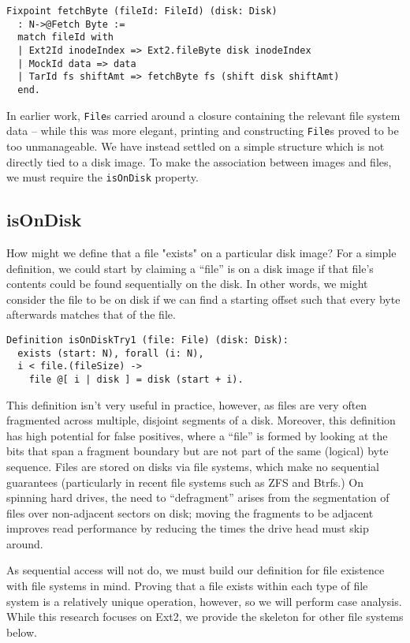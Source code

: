 \documentclass[nocopyrightspace]{sigplanconf}
\begin{document}
\begin{lstlisting}
Fixpoint fetchByte (fileId: FileId) (disk: Disk)
  : N->@Fetch Byte := 
  match fileId with
  | Ext2Id inodeIndex => Ext2.fileByte disk inodeIndex
  | MockId data => data
  | TarId fs shiftAmt => fetchByte fs (shift disk shiftAmt)
  end.
\end{lstlisting}

In earlier work, {\tt File}s carried around a closure containing the relevant
file system data -- while this was more elegant, printing and constructing
{\tt File}s proved to be too unmanageable. We have instead settled on a simple
structure which is not directly tied to a disk image. To make the association
between images and files, we must require the {\tt isOnDisk} property.

\subsection{isOnDisk}

How might we define that a file "exists" on a particular disk image? For a
simple definition, we could start by claiming a ``file'' is on a disk image if
that file's contents could be found sequentially on the disk. In other words,
we might consider the file to be on disk if we can find a starting offset such
that every byte afterwards matches that of the file.

\begin{lstlisting}
Definition isOnDiskTry1 (file: File) (disk: Disk):
  exists (start: N), forall (i: N),
  i < file.(fileSize) -> 
    file @[ i | disk ] = disk (start + i).
\end{lstlisting}

This definition isn't very useful in practice, however, as files are very
often fragmented across multiple, disjoint segments of a disk. Moreover, this
definition has high potential for false positives, where a ``file'' is formed
by looking at the bits that span a fragment boundary but are not part of the
same (logical) byte sequence. Files are stored on disks via file systems,
which make no sequential guarantees (particularly in recent file systems such
as ZFS and Btrfs.) On spinning hard drives, the need to ``defragment'' arises
from the segmentation of files over non-adjacent sectors on disk; moving the
fragments to be adjacent improves read performance by reducing the times the
drive head must skip around.

As sequential access will not do, we must build our definition for file
existence with file systems in mind. Proving that a file exists within each
type of file system is a relatively unique operation, however, so we will
perform case analysis. While this research focuses on Ext2, we provide the
skeleton for other file systems below.
\end{document}
